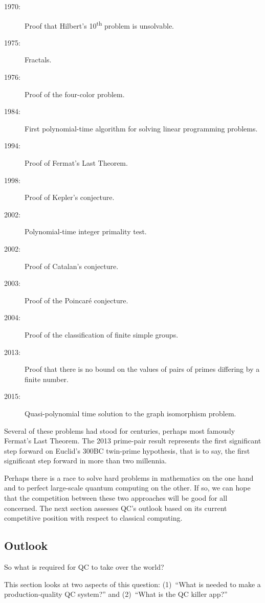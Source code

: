 \begin{description}
\item[1970:] Proof that Hilbert's 10\textsuperscript{th} problem
	is unsolvable.
\item[1975:] Fractals.
\item[1976:] Proof of the four-color problem.
\item[1984:] First polynomial-time algorithm for solving linear
	programming problems.
\item[1994:] Proof of Fermat's Last Theorem.
\item[1998:] Proof of Kepler's conjecture.
\item[2002:] Polynomial-time integer primality test.
\item[2002:] Proof of Catalan's conjecture.
\item[2003:] Proof of the Poincar\'e conjecture.
\item[2004:] Proof of the classification of finite simple groups.
\item[2013:] Proof that there is no bound on the values of
	pairs of primes differing by a finite number.
\item[2015:] Quasi-polynomial time solution to the graph isomorphism
	problem.
\end{description}

Several of these problems had stood for centuries, perhaps most famously
Fermat's Last Theorem.
The 2013 prime-pair result represents the first significant step forward
on Euclid's 300BC twin-prime hypothesis, that is to say, the first
significant step forward in more than two millennia.

Perhaps there is a race to solve hard problems in mathematics on
the one hand and to perfect large-scale quantum computing on
the other.
If so, we can hope that the competition between these two approaches
will be good for all concerned.
The next section assesses QC's outlook based on its current
competitive position with respect to classical computing.

\subsection{Outlook}
\label{sec:future:Outlook}

So what is required for QC to take over the world?

This section looks at two aspects of this question:
(1)~``What is needed to make a production-quality QC system?'' and
(2)~``What is the QC killer app?''


